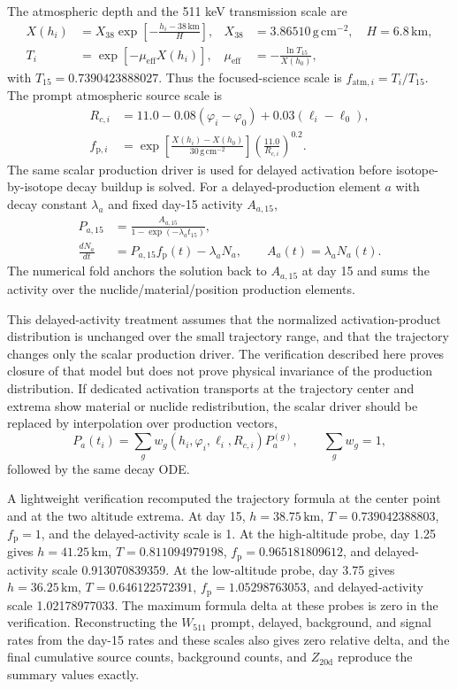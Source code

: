 \documentclass[preprint,12pt]{elsarticle}
\newcommand{\wii}{W_{511}}
\begin{document}
The atmospheric depth and the 511 keV transmission scale are
\begin{align}
  X(h_i) &= X_{38}\exp\!\left[-\frac{h_i-38\,\mathrm{km}}{H}\right],
       & X_{38}&=3.86510\,\mathrm{g\,cm^{-2}},\quad H=6.8\,\mathrm{km},\\
  T_i &= \exp[-\mu_{\mathrm{eff}} X(h_i)],
       & \mu_{\mathrm{eff}}&=-\frac{\ln T_{15}}{X(h_0)},
\end{align}
with $T_{15}=0.7390423888027$. Thus the focused-science scale is
$f_{\mathrm{atm},i}=T_i/T_{15}$. The prompt atmospheric source scale is
\begin{align}
  R_{c,i} &= 11.0 -0.08(\varphi_i-\varphi_0)+0.03(\ell_i-\ell_0),\\
  f_{\mathrm{p},i} &=
  \exp\!\left[\frac{X(h_i)-X(h_0)}{30\,\mathrm{g\,cm^{-2}}}\right]
  \left(\frac{11.0}{R_{c,i}}\right)^{0.2}.
\end{align}
The same scalar production driver is used for delayed activation before
isotope-by-isotope decay buildup is solved. For a delayed-production element
$a$ with decay constant $\lambda_a$ and fixed day-15 activity $A_{a,15}$,
\begin{align}
  P_{a,15} &= \frac{A_{a,15}}{1-\exp(-\lambda_a t_{15})},\\
  \frac{dN_a}{dt} &= P_{a,15}f_{\mathrm{p}}(t)-\lambda_a N_a,\qquad
  A_a(t)=\lambda_a N_a(t).
\end{align}
The numerical fold anchors the solution back to $A_{a,15}$ at day 15 and sums
the activity over the nuclide/material/position production elements.

This delayed-activity treatment assumes that the normalized activation-product
distribution is unchanged over the small trajectory range, and that the
trajectory changes only the scalar production driver. The verification
described here proves closure of that model but does not prove physical
invariance of the production distribution. If dedicated activation transports at the trajectory center and
extrema show material or nuclide redistribution, the scalar driver should be
replaced by interpolation over production vectors,
\begin{equation}
  P_a(t_i)=\sum_g w_g(h_i,\varphi_i,\ell_i,R_{c,i})P_a^{(g)},\qquad
  \sum_g w_g=1,
\end{equation}
followed by the same decay ODE.

A lightweight verification recomputed the trajectory formula at the center point and at the
two altitude extrema. At day 15, $h=38.75\,\mathrm{km}$, $T=0.739042388803$,
$f_{\mathrm{p}}=1$, and the delayed-activity scale is 1. At the high-altitude
probe, day 1.25 gives $h=41.25\,\mathrm{km}$, $T=0.811094979198$,
$f_{\mathrm{p}}=0.965181809612$, and delayed-activity scale 0.913070839359.
At the low-altitude probe, day 3.75 gives $h=36.25\,\mathrm{km}$,
$T=0.646122572391$, $f_{\mathrm{p}}=1.05298763053$, and delayed-activity
scale 1.02178977033. The maximum formula delta at these probes is zero in the
verification. Reconstructing the $\wii$ prompt, delayed, background, and signal rates
from the day-15 rates and these scales also gives zero relative delta, and the
final cumulative source counts, background counts, and $Z_{20\mathrm{d}}$
reproduce the summary values exactly.
\end{document}
